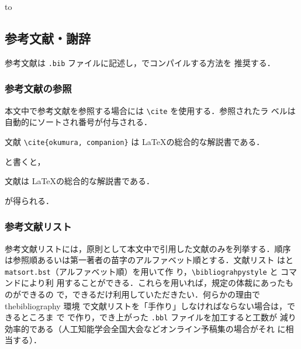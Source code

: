 \documentclass[a4j]{matsushita-zemi}
\begin{document}
\begin{table}[tb] 
  \caption{表の例} 
  \label{tab:example}
  \hbox to
\end{table}

\subsection{参考文献・謝辞}

参考文献は \verb|.bib| ファイルに記述し，\BibTeX でコンパイルする方法を
推奨する．

\subsubsection{参考文献の参照}

本文中で参考文献を参照する場合には \verb|\cite| を使用する．参照されたラ
ベルは自動的にソートされ番号が付与される．

\begin{framed}
文献 \verb|\cite{okumura, companion}| は \LaTeX の総合的な解説書である．
\end{framed}
\noindent
と書くと，
\begin{framed}
文献\cite{okumura, companion}は \LaTeX の総合的な解説書である．
\end{framed}
\noindent
が得られる．

\subsubsection{参考文献リスト}

参考文献リストには，原則として本文中で引用した文献のみを列挙する．順序
は参照順あるいは第一著者の苗字のアルファベット順とする．文献リスト
は\BibTeX と\verb|matsort.bst|（アルファベット順）を用いて作
り，\verb|\bibliograhpystyle| と \verb || コマンドにより利
用することができる．これらを用いれば，規定の体裁にあったものができるの
で，できるだけ利用していただきたい．何らかの理由で thebibliography 環境
で文献リストを「手作り」しなければならない場合は，できるところま
で \BibTeX で作り，でき上がった \verb|.bbl| ファイルを加工すると工数が
減り効率的である（人工知能学会全国大会などオンライン予稿集の場合がそれ
に相当する）．
\end{document}

